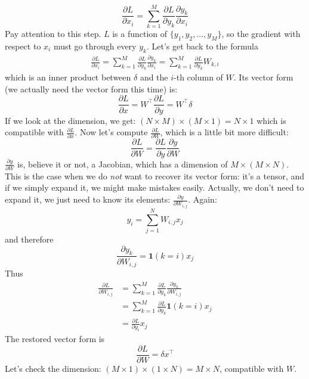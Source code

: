 \documentclass{article}
\begin{document}
\begin{equation}
    \frac{\partial L}{\partial x_i} = \sum_{k=1}^M\frac{\partial L}{\partial y_k}\frac{\partial y_k}{\partial x_i}
\end{equation}
Pay attention to this step. $L$ is a function of $\{y_1, y_2, \dots, y_M\}$, so the gradient with respect to $x_i$ must go through every $y_k$. Let's get back to the formula
\begin{align}
    \frac{\partial L}{\partial x_i} = \sum_{k=1}^M\frac{\partial L}{\partial y_k}\frac{\partial y_k}{\partial x_i} = \sum_{k=1}^M\frac{\partial L}{\partial y_k}W_{k, i}
\end{align}
which is an inner product between $\delta$ and the $i$-th column of $W$. Its vector form (we actually need the vector form this time) is:
\begin{equation}
    \frac{\partial L}{\partial x} 
    = W^\top\frac{\partial L}{\partial y} = W^\top\delta
\end{equation}
If we look at the dimension, we get: $(N\times M) \times (M \times 1)=N \times 1$ which is compatible with $\frac{\partial L}{\partial x}$. 
Now let's compute $\frac{\partial L}{\partial W}$, which is a little bit more difficult:
\begin{equation}
    \frac{\partial L}{\partial W} = \frac{\partial L}{\partial y}\frac{\partial y}{\partial W}
\end{equation}
$\frac{\partial y}{\partial W}$ is, believe it or not, a Jacobian, which has a dimension of $M\times(M\times N)$. This is the case when we do \emph{not} want to recover its vector form: it's a tensor, and if we simply expand it, we might make mistakes easily. Actually, we don't need to expand it, we just need to know its elements: $\frac{\partial y}{\partial W_{i, j}}$. Again:
\begin{equation}
    y_i = \sum_{j=1}^NW_{i, j}x_j
\end{equation}
and therefore
\begin{equation}
    \frac{\partial y_k}{\partial W_{i, j}} = \mathbf{1}(k=i)x_j
\end{equation}
Thus
\begin{align}
    \frac{\partial L}{\partial W_{i, j}} 
    &= \sum_{k=1}^M\frac{\partial L}{\partial y_k}\frac{\partial y_k}{\partial W_{i, j}} \\
    &= \sum_{k=1}^M\frac{\partial L}{\partial y_k}\mathbf{1}(k=i)x_j \\
    &= \frac{\partial L}{\partial y_i}x_j
\end{align}
The restored vector form is
\begin{equation}
    \frac{\partial L}{\partial W} = \delta x^\top 
\end{equation}
Let's check the dimension: $(M\times 1) \times (1 \times N) = M \times N$, compatible with $W$. 
\end{document}
